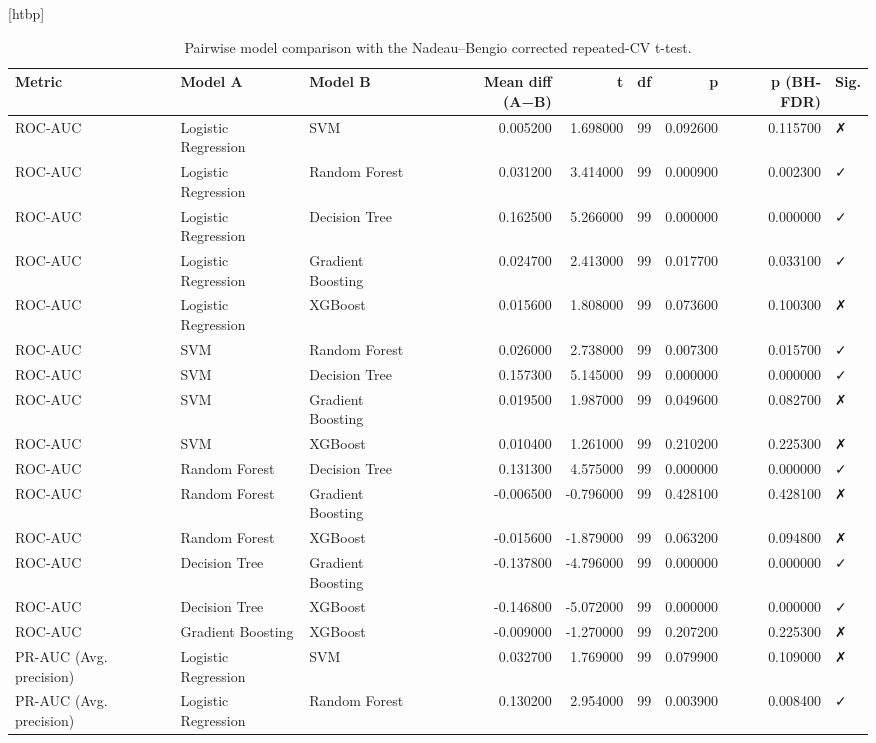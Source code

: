 \begin{table}
\small[htbp]
\caption{Pairwise model comparison with the Nadeau–Bengio corrected repeated-CV t-test.}
\label{tab:P03_corrected_ttests}
\begin{tabular}{lllrrrrrl}
\toprule
Metric & Model A & Model B & Mean diff (A−B) & t & df & p & p (BH-FDR) & Sig. \\
\midrule
ROC-AUC & Logistic Regression & SVM & 0.005200 & 1.698000 & 99 & 0.092600 & 0.115700 & ✗ \\
ROC-AUC & Logistic Regression & Random Forest & 0.031200 & 3.414000 & 99 & 0.000900 & 0.002300 & ✓ \\
ROC-AUC & Logistic Regression & Decision Tree & 0.162500 & 5.266000 & 99 & 0.000000 & 0.000000 & ✓ \\
ROC-AUC & Logistic Regression & Gradient Boosting & 0.024700 & 2.413000 & 99 & 0.017700 & 0.033100 & ✓ \\
ROC-AUC & Logistic Regression & XGBoost & 0.015600 & 1.808000 & 99 & 0.073600 & 0.100300 & ✗ \\
ROC-AUC & SVM & Random Forest & 0.026000 & 2.738000 & 99 & 0.007300 & 0.015700 & ✓ \\
ROC-AUC & SVM & Decision Tree & 0.157300 & 5.145000 & 99 & 0.000000 & 0.000000 & ✓ \\
ROC-AUC & SVM & Gradient Boosting & 0.019500 & 1.987000 & 99 & 0.049600 & 0.082700 & ✗ \\
ROC-AUC & SVM & XGBoost & 0.010400 & 1.261000 & 99 & 0.210200 & 0.225300 & ✗ \\
ROC-AUC & Random Forest & Decision Tree & 0.131300 & 4.575000 & 99 & 0.000000 & 0.000000 & ✓ \\
ROC-AUC & Random Forest & Gradient Boosting & -0.006500 & -0.796000 & 99 & 0.428100 & 0.428100 & ✗ \\
ROC-AUC & Random Forest & XGBoost & -0.015600 & -1.879000 & 99 & 0.063200 & 0.094800 & ✗ \\
ROC-AUC & Decision Tree & Gradient Boosting & -0.137800 & -4.796000 & 99 & 0.000000 & 0.000000 & ✓ \\
ROC-AUC & Decision Tree & XGBoost & -0.146800 & -5.072000 & 99 & 0.000000 & 0.000000 & ✓ \\
ROC-AUC & Gradient Boosting & XGBoost & -0.009000 & -1.270000 & 99 & 0.207200 & 0.225300 & ✗ \\
PR-AUC (Avg. precision) & Logistic Regression & SVM & 0.032700 & 1.769000 & 99 & 0.079900 & 0.109000 & ✗ \\
PR-AUC (Avg. precision) & Logistic Regression & Random Forest & 0.130200 & 2.954000 & 99 & 0.003900 & 0.008400 & ✓ \\

\end{tabular}
\end{table}

